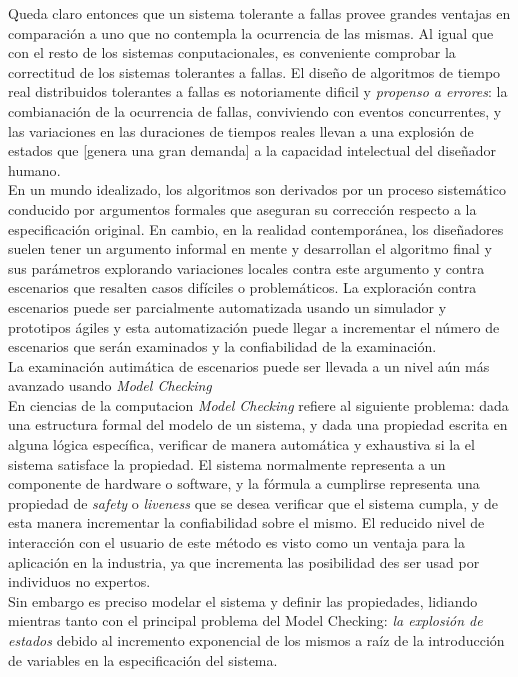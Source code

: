 \documentclass[titlepage, 12pt]{book}
\begin{document}
Queda claro entonces que un sistema tolerante a fallas provee grandes ventajas en comparaci\'on a uno que no contempla la ocurrencia de las mismas. Al igual que con el resto de los sistemas conputacionales, es conveniente comprobar la correctitud de los sistemas tolerantes a fallas.
El dise\~no de algoritmos de tiempo real distribuidos tolerantes a fallas es notoriamente dificil y \emph{propenso a errores}: la combianaci\'on de la ocurrencia de fallas, conviviendo con eventos concurrentes, y las variaciones en las duraciones de tiempos reales llevan a una explosi\'on de estados que [genera una gran demanda] a la capacidad intelectual del dise\~nador humano\cite{SteinerRushby}.\\
En un mundo idealizado, los algoritmos son derivados por un proceso sistem\'atico conducido por argumentos formales que aseguran su correcci\'on respecto a la especificaci\'on original. En cambio, en la realidad contempor\'anea, los diseñadores suelen tener un argumento informal en mente y desarrollan el algoritmo final y sus par\'ametros explorando variaciones locales contra este argumento y contra escenarios que resalten casos dif\'iciles o problem\'aticos. La exploraci\'on contra escenarios puede ser parcialmente automatizada usando un simulador y prototipos \'agiles y esta automatizaci\'on puede llegar a incrementar el n\'umero de escenarios que ser\'an examinados y la confiabilidad de la examinaci\'on.\\ La examinaci\'on autim\'atica de escenarios puede ser llevada a un nivel a\'un m\'as avanzado usando \emph{Model Checking} \cite{SteinerRushby}\\

En ciencias de la computacion \emph{Model Checking} refiere al siguiente problema: dada una estructura formal del modelo de un sistema, y dada una propiedad escrita en alguna l\'ogica espec\'ifica, verificar de manera autom\'atica y exhaustiva si la el sistema satisface la propiedad. El sistema normalmente representa a un componente de hardware o software, y la f\'ormula a cumplirse representa una propiedad de \emph{safety} o \emph{liveness} que se desea verificar que el sistema cumpla, y de esta manera incrementar la confiabilidad sobre el mismo.
El reducido nivel de interacci\'on con el usuario de este m\'etodo es visto como un ventaja para la aplicaci\'on en la industria, ya que incrementa las posibilidad des ser usad por individuos no expertos.\cite{RuysBrinksma}\\
Sin embargo es preciso modelar el sistema y definir las propiedades, lidiando mientras tanto con el principal problema del Model Checking: \emph{la explosi\'on de estados} debido al incremento exponencial de los mismos a ra\'iz de la introducci\'on de variables en la especificaci\'on del sistema.\\
\end{document}
